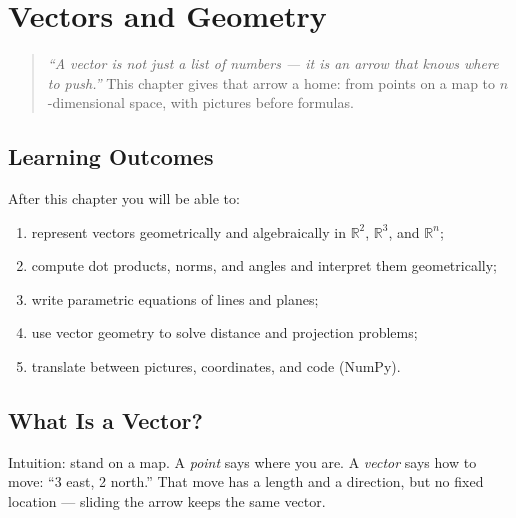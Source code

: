 \chapter{Vectors and Geometry}
\label{ch:vectors}

\begin{quote}
\emph{``A vector is not just a list of numbers --- it is an arrow that knows where to push.''} This chapter gives that arrow a home: from points on a map to $n$-dimensional space, with pictures before formulas.
\end{quote}

\noindent{}
\vspace{0.4em}

\section*{Learning Outcomes}
After this chapter you will be able to:
\begin{enumerate}[label=(L\arabic*)]
    \item represent vectors geometrically and algebraically in $\mathbb{R}^2$, $\mathbb{R}^3$, and $\mathbb{R}^n$;
    \item compute dot products, norms, and angles and interpret them geometrically;
    \item write parametric equations of lines and planes;
    \item use vector geometry to solve distance and projection problems;
    \item translate between pictures, coordinates, and code (NumPy).
\end{enumerate}

\section{What Is a Vector?}
\label{sec:what-is-vector}
Intuition: stand on a map. A \emph{point} says where you are. A \emph{vector} says how to move: ``3 east, 2 north.'' That move has a length and a direction, but no fixed location --- sliding the arrow keeps the same vector.

